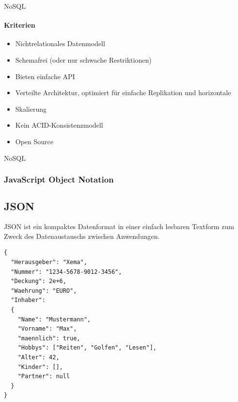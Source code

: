 \documentclass[11pt]{beamer}
\begin{document}
\begin{frame}{NoSQL}
\framesubtitle{Kriterien}
\begin{itemize}
\item Nichtrelationales Datenmodell
\item Schemafrei (oder nur schwache Restriktionen)
\item Bieten einfache API
\item Verteilte Architektur, optimiert für einfache Replikation und horizontale \item Skalierung
\item Kein ACID-Konsistenzmodell
\item Open Source
\end{itemize}
\end{frame}

\begin{frame}{NoSQL}
\begin{figure}
\end{figure}
\end{frame}

\begin{frame}[fragile]
\frametitle{JavaScript Object Notation}
\subsection{JSON}
JSON ist ein kompaktes Datenformat in einer einfach lesbaren Textform zum Zweck des Datenaustauschs zwischen Anwendungen.


\begin{lstlisting}
{
  "Herausgeber": "Xema",
  "Nummer": "1234-5678-9012-3456",
  "Deckung": 2e+6,
  "Waehrung": "EURO",
  "Inhaber":
  {
    "Name": "Mustermann",
    "Vorname": "Max",
    "maennlich": true,
    "Hobbys": ["Reiten", "Golfen", "Lesen"],
    "Alter": 42,
    "Kinder": [],
    "Partner": null
  }
}
\end{lstlisting}

\end{frame}
\end{document}
